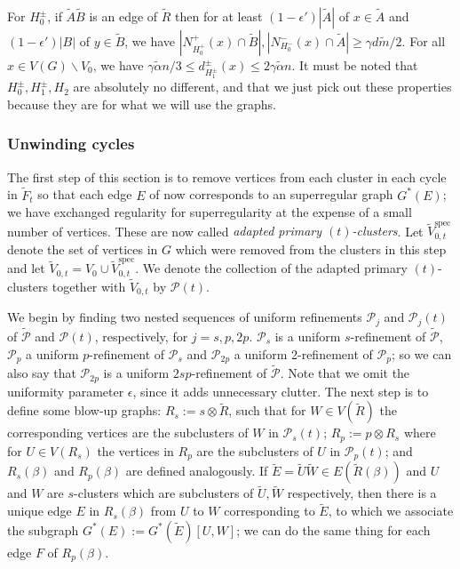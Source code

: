 \documentclass[10pt,letterpaper, reqno]{amsart}
\theoremstyle{definition}
\numberwithin{equation}{section}
\begin{document}
For $H^\pm_0$, if $\tilde{A}\tilde{B}$ is an edge of $\tilde{R}$ then for at least $(1-\epsilon')|\tilde{A}|$ of $x \in \tilde{A}$ and $(1-\epsilon')|B|$ of $y\in \tilde{B}$, we have $|N^+_{H_0^+}(x) \cap\tilde{B}|, |N^-_{H_0^-}(x) \cap \tilde{A}| \geq \gamma d \tilde{m}/2$. For all $x \in V(G) \backslash V_0$, we have $\gamma \tilde{\alpha}n/3 \leq d^\pm_{H^\pm_1}(x) \leq 2\gamma \tilde{\alpha}n$. It must be noted that $H_0^\pm,H_1^\pm,H_2$ are absolutely no different, and that we just pick out these properties because they are for what we will use the graphs. 

\subsubsection{Unwinding cycles} The first step of this section is to remove vertices from each cluster in each cycle in $\tilde{F}_t$ so that each edge $E$ of now corresponds to an superregular graph $G^*(E)$; we have exchanged regularity for superregularity at the expense of a small number of vertices. These are now called \textit{adapted primary $(t)$-clusters}. Let $\tilde{V}_{0,t}^\text{spec}$ denote the set of vertices in $G$ which were removed from the clusters in this step and let $\tilde{V}_{0,t} = V_0 \cup\tilde{V}_{0,t}^\text{spec}$. We denote the collection of the adapted primary $(t)$-clusters together with $\tilde{V}_{0,t}$ by $\mathcal{P}(t)$.

We begin by finding two nested sequences of uniform refinements $\mathcal{P}_j$ and $\mathcal{P}_j(t)$ of $\tilde{\mathcal{P}}$ and $\mathcal{P}(t)$,  respectively, for $j=s,p,2p$. $\mathcal{P}_s$ is a uniform $s$-refinement of $\tilde{\mathcal{P}}$, $\mathcal{P}_p$ a uniform $p$-refinement of $\mathcal{P}_s$ and $\mathcal{P}_{2p}$ a uniform 2-refinement of $\mathcal{P}_p$; so we can also say that $\mathcal{P}_{2p}$ is a uniform $2sp$-refinement of $\tilde{\mathcal{P}}$. Note that we omit the uniformity parameter $\epsilon$, since it adds unnecessary clutter. The next step is to define some blow-up graphs: $R_s := s \otimes \tilde{R}$, such that for $W \in V(\tilde{R})$ the corresponding vertices are the subclusters of $W$ in $\mathcal{P}_s(t)$; $R_p := p \otimes R_s$ where for $U \in V(R_s)$ the vertices in $R_p$ are the subclusters of $U$ in $\mathcal{P}_p(t)$; and $R_s(\beta)$ and $R_p(\beta)$ are defined analogously. If $\tilde{E} = \tilde{U} \tilde{W} \in E(\tilde{R}(\beta))$ and $U$ and $W$ are $s$-clusters which are subclusters of $\tilde{U}, \tilde{W}$ respectively, then there is a unique edge $E$ in $R_s(\beta)$ from $U$ to $W$ corresponding to $\tilde{E}$, to which we associate the subgraph $G^*(E) := G^*(\tilde{E})[U,W]$; we can do the same thing for each edge $F$ of $R_p(\beta)$. 
\end{document}
